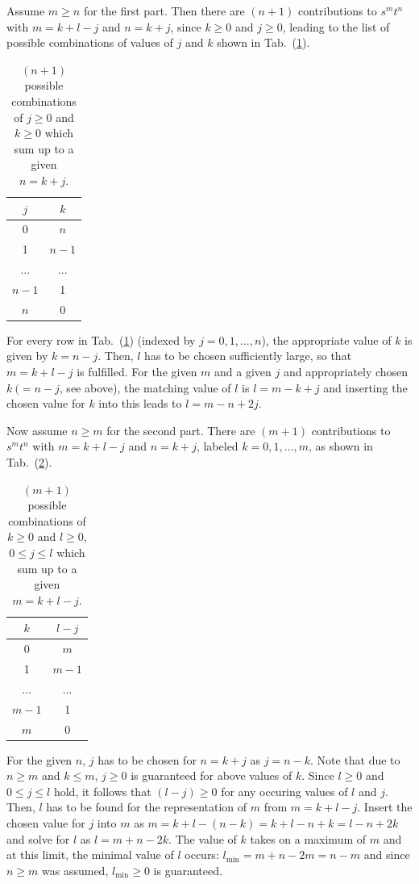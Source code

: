 Assume $m \geq n$ for the first part.
Then there are $(n+1)$ contributions to $s^m t^n$ with $m=k+l-j$ and $n=k+j$,
since $k \geq 0$ and $j \geq 0$, leading to the list of possible combinations of values of $j$ and $k$ shown in Tab.~(\ref{tab:from_j_k_to_n}).
\begin{table}[htbp]
  \centering
  \begin{tabular}{c|c}
    $j$ & $k$ \\
    \hline
    0 & $n$ \\
    1 & $n-1$ \\
    ... & ... \\
    $n-1$ & 1 \\
    $n$ & 0
  \end{tabular}
  \caption{$(n+1)$ possible combinations of $j \geq 0$ and $k \geq 0$ which sum up to a given $n=k+j$.}
  \label{tab:from_j_k_to_n}
\end{table}
For every row in Tab.~(\ref{tab:from_j_k_to_n}) (indexed by $j=0, 1, ..., n$), the appropriate value of $k$ is given by $k=n-j$.
Then, $l$ has to be chosen sufficiently large, so that $m=k+l-j$ is fulfilled.
For the given $m$ and a given $j$ and appropriately chosen $k~(=n-j$, see above), the matching value
of $l$ is $l=m-k+j$ and inserting the chosen value for $k$ into this leads to $l=m-n+2j$.

Now assume $n \geq m$ for the second part.
There are $(m+1)$ contributions to $s^m t^n$ with $m=k+l-j$ and $n=k+j$,
labeled $k=0, 1, ..., m$, as shown in Tab.~(\ref{tab:from_k_lmj_to_m}).
\begin{table}[htbp]
  \centering
  \begin{tabular}{c|c}
    $k$ & $l-j$ \\
    \hline
    0 & $m$ \\
    1 & $m-1$ \\
    ... & ... \\
    $m-1$ & 1 \\
    $m$ & 0
  \end{tabular}
  \caption{$(m+1)$ possible combinations of $k \geq 0$ and $l \geq 0$, $0 \leq j \leq l$ which sum up to a given $m=k+l-j$.}
  \label{tab:from_k_lmj_to_m}
\end{table}
For the given $n$, $j$ has to be chosen for $n=k+j$ as $j=n-k$.
Note that due to $n \geq m$ and $k \leq m$, $j \geq 0$ is guaranteed for above values of $k$.
Since $l \geq 0$ and $0 \leq j \leq l$ hold, it follows that $(l-j) \geq 0$ for any occuring values of $l$ and $j$.
Then, $l$ has to be found for the representation of $m$ from $m=k+l-j$.
Insert the chosen value for $j$ into $m$ as $m=k+l-(n-k) = k+l-n+k = l-n+2k$
and solve for $l$ as $l=m+n-2k$.
The value of $k$ takes on a maximum of $m$ and at this limit, the minimal value of $l$ occurs:
$l_\textrm{min} = m+n-2m = n-m$ and since $n \geq m$ was assumed, $l_\textrm{min} \geq 0$ is guaranteed.

